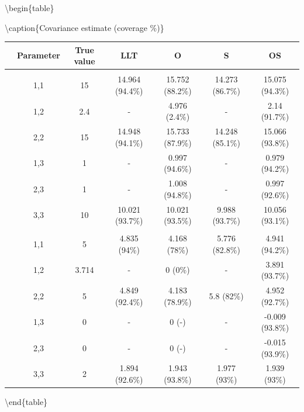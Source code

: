 \documentclass[
]{article}
\begin{document}
\textbackslash begin\{table\}

\textbackslash caption\{\label{tab:unnamed-chunk-19}Covariance estimate (coverage \%)\}
\centering

\begin{tabular}[t]{ccccccc}
\toprule
 & Parameter & True value & LLT & O & S & OS\\
\midrule
\addlinespace[0.3em]
\multicolumn{7}{l}{\textbf{Observation Error}}\\
\hspace{1em} & 1,1 & 15 & 14.964 (94.4\%) & 15.752 (88.2\%) & 14.273 (86.7\%) & 15.075 (94.3\%)\\
\cmidrule{2-7}
\hspace{1em} & 1,2 & 2.4 & - & 4.976 (2.4\%) & - & 2.14 (91.7\%)\\
\cmidrule{2-7}
\hspace{1em} & 2,2 & 15 & 14.948 (94.1\%) & 15.733 (87.9\%) & 14.248 (85.1\%) & 15.066 (93.8\%)\\
\cmidrule{2-7}
\hspace{1em} & 1,3 & 1 & - & 0.997 (94.6\%) & - & 0.979 (94.2\%)\\
\cmidrule{2-7}
\hspace{1em} & 2,3 & 1 & - & 1.008 (94.8\%) & - & 0.997 (92.6\%)\\
\cmidrule{2-7}
\hspace{1em} & 3,3 & 10 & 10.021 (93.7\%) & 10.021 (93.5\%) & 9.988 (93.7\%) & 10.056 (93.1\%)\\
\cmidrule{1-7}
\addlinespace[0.3em]
\multicolumn{7}{l}{\textbf{State Process}}\\
\hspace{1em} & 1,1 & 5 & 4.835 (94\%) & 4.168 (78\%) & 5.776 (82.8\%) & 4.941 (94.2\%)\\
\cmidrule{2-7}
\hspace{1em} & 1,2 & 3.714 & - & 0 (0\%) & - & 3.891 (93.7\%)\\
\cmidrule{2-7}
\hspace{1em} & 2,2 & 5 & 4.849 (92.4\%) & 4.183 (78.9\%) & 5.8 (82\%) & 4.952 (92.7\%)\\
\cmidrule{2-7}
\hspace{1em} & 1,3 & 0 & - & 0 (-) & - & -0.009 (93.8\%)\\
\cmidrule{2-7}
\hspace{1em} & 2,3 & 0 & - & 0 (-) & - & -0.015 (93.9\%)\\
\cmidrule{2-7}
\hspace{1em} & 3,3 & 2 & 1.894 (92.6\%) & 1.943 (93.8\%) & 1.977 (93\%) & 1.939 (93\%)\\
\bottomrule
\end{tabular}

\textbackslash end\{table\}
\end{document}
